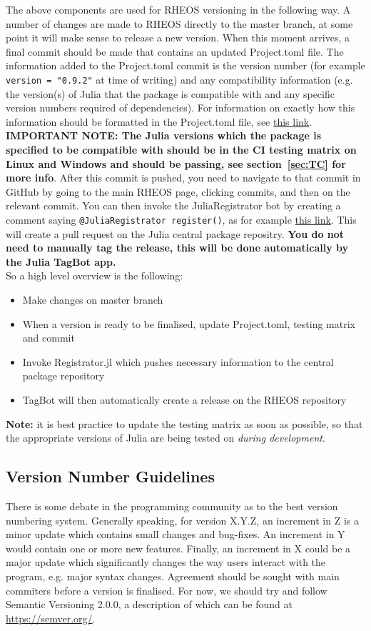 \documentclass[]{article}
\newcommand{\link}[2]{{\color{blue}\href{#1}{#2}}}
\newcommand{\cod}[1]{\colorbox{light-light-gray}{\texttt{#1}}}
\begin{document}
The above components are used for RHEOS versioning in the following way. A number of changes are made to RHEOS directly to the master branch, at some point it will make sense to release a new version. When this moment arrives, a final commit should be made that contains an updated Project.toml file. The information added to the Project.toml commit is the version number (for example \cod{version = "0.9.2"} at time of writing) and any compatibility information (e.g. the version(s) of Julia that the package is compatible with and any specific version numbers required of dependencies). For information on exactly how this information should be formatted in the Project.toml file, see \link{https://julialang.github.io/Pkg.jl/v1/compatibility/index.html}{this link}. \textbf{IMPORTANT NOTE: The Julia versions which the package is specified to be compatible with should be in the CI testing matrix on Linux and Windows and should be passing, see section~\ref{sec:TC} for more info}. After this commit is pushed, you need to navigate to that commit in GitHub by going to the main RHEOS page, clicking commits, and then on the relevant commit. You can then invoke the JuliaRegistrator bot by creating a comment saying \cod{@JuliaRegistrator register()}, as for example \link{https://github.com/JuliaRheology/RHEOS.jl/commit/e2e63c299615a32ab2d7e055484b3efc662544c4}{this link}. This will create a pull request on the Julia central package repositry. \textbf{You do not need to manually tag the release, this will be done automatically by the Julia TagBot app.}\\
\newpage
So a high level overview is the following:
\begin{itemize}
	\item Make changes on master branch
	\item When a version is ready to be finalised, update Project.toml, testing matrix and commit
	\item Invoke Registrator.jl which pushes necessary information to the central package repository
	\item TagBot will then automatically create a release on the RHEOS repository
\end{itemize}

\textbf{Note:} it is best practice to update the testing matrix as soon as possible, so that the appropriate versions of Julia are being tested on \textit{during development}.
\subsection{Version Number Guidelines}
There is some debate in the programming community as to the best version numbering system. Generally speaking, for version X.Y.Z, an increment in Z is a minor update which contains small changes and bug-fixes. An increment in Y would contain one or more new features. Finally, an increment in X could be a major update which significantly changes the way users interact with the program, e.g. major syntax changes. Agreement should be sought with main commiters before a version is finalised. For now, we should try and follow Semantic Versioning 2.0.0, a description of which can be found at \link{https://semver.org/}{https://semver.org/}.
\end{document}
